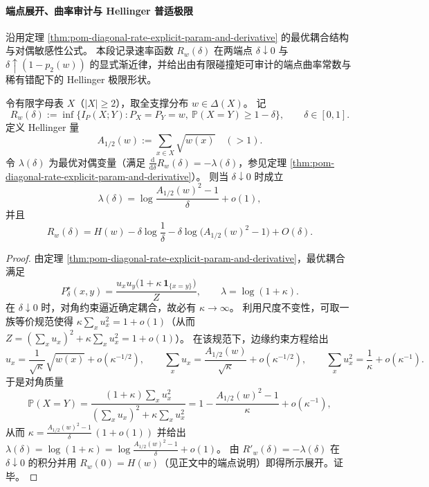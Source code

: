 
\paragraph{端点展开、曲率审计与 Hellinger 普适极限}
沿用定理 \ref{thm:pom-diagonal-rate-explicit-param-and-derivative} 的最优耦合结构与对偶敏感性公式。
本段记录速率函数 \(R_w(\delta)\) 在两端点 \(\delta\downarrow 0\) 与 \(\delta\uparrow (1-p_2(w))\) 的显式渐近律，并给出由有限碰撞矩可审计的端点曲率常数与稀有错配下的 Hellinger 极限形状。

\begin{theorem}\label{thm:pom-diagonal-rate-small-distortion-hellinger-endpoint}
令有限字母表 \(X\)（\(|X|\ge2\)），取全支撑分布 \(w\in\Delta(X)\)。
记
\[
R_w(\delta):=\inf\{I_P(X;Y):P_X=P_Y=w,\ \mathbb P(X=Y)\ge 1-\delta\},\qquad \delta\in[0,1].
\]
定义 Hellinger 量
\[
A_{1/2}(w):=\sum_{x\in X}\sqrt{w(x)}\quad(>1).
\]
令 \(\lambda(\delta)\) 为最优对偶变量（满足 \(\frac{\mathrm d}{\mathrm d\delta}R_w(\delta)=-\lambda(\delta)\)，参见定理 \ref{thm:pom-diagonal-rate-explicit-param-and-derivative}）。
则当 \(\delta\downarrow 0\) 时成立
\[
\lambda(\delta)=\log\frac{A_{1/2}(w)^2-1}{\delta}+o(1),
\]
并且
\[
R_w(\delta)
=H(w)-\delta\log\frac{1}{\delta}-\delta\log\bigl(A_{1/2}(w)^2-1\bigr)+O(\delta).
\]
\end{theorem}
\begin{proof}
由定理 \ref{thm:pom-diagonal-rate-explicit-param-and-derivative}，最优耦合满足
\[
P^\star_\delta(x,y)=\frac{u_xu_y\bigl(1+\kappa\,\mathbf 1_{\{x=y\}}\bigr)}{Z},
\qquad \lambda=\log(1+\kappa).
\]
在 \(\delta\downarrow 0\) 时，对角约束逼近确定耦合，故必有 \(\kappa\to\infty\)。
利用尺度不变性，可取一族等价规范使得
\(
\kappa\sum_x u_x^2=1+o(1)
\)（从而 \(Z=(\sum_x u_x)^2+\kappa\sum_x u_x^2=1+o(1)\)）。
在该规范下，边缘约束方程给出
\[
u_x=\frac{1}{\sqrt{\kappa}}\sqrt{w(x)}+o(\kappa^{-1/2}),
\qquad
\sum_x u_x=\frac{A_{1/2}(w)}{\sqrt{\kappa}}+o(\kappa^{-1/2}),
\qquad
\sum_x u_x^2=\frac{1}{\kappa}+o(\kappa^{-1}).
\]
于是对角质量
\[
\mathbb P(X=Y)
=\frac{(1+\kappa)\sum_x u_x^2}{(\sum_x u_x)^2+\kappa\sum_x u_x^2}
=1-\frac{A_{1/2}(w)^2-1}{\kappa}+o(\kappa^{-1}),
\]
从而
\(
\kappa=\frac{A_{1/2}(w)^2-1}{\delta}\,(1+o(1))
\)
并给出
\(
\lambda(\delta)=\log(1+\kappa)=\log\frac{A_{1/2}(w)^2-1}{\delta}+o(1)
\)。
由 \(R'_w(\delta)=-\lambda(\delta)\) 在 \(\delta\downarrow 0\) 的积分并用 \(R_w(0)=H(w)\)（见正文中的端点说明）即得所示展开。证毕。
\end{proof}

